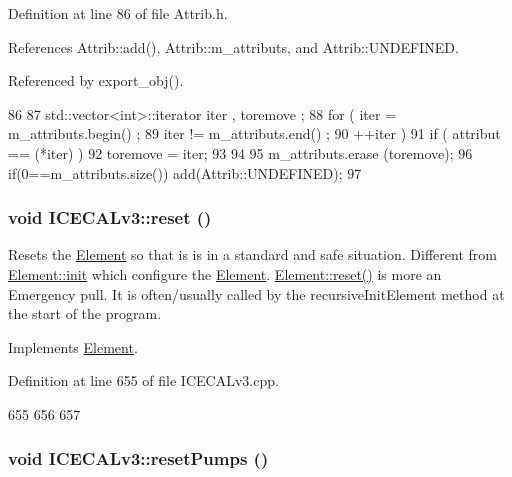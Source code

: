 Definition at line 86 of file Attrib.h.

References Attrib::add(), Attrib::m\_\-attributs, and Attrib::UNDEFINED.

Referenced by export\_\-obj().


\begin{DoxyCode}
86                                {
87     std::vector<int>::iterator iter , toremove ;
88     for ( iter  = m_attributs.begin() ;
89           iter != m_attributs.end()   ;
90           ++iter ) {
91       if ( attribut == (*iter) ) {
92         toremove = iter;
93       }
94     }
95     m_attributs.erase (toremove);
96     if(0==m_attributs.size()) add(Attrib::UNDEFINED);
97   }
\end{DoxyCode}
\hypertarget{classICECALv3_a33afc7c8e0f399336152abd03cbe8d1b}{
\subsubsection[{reset}]{\setlength{\rightskip}{0pt plus 5cm}void ICECALv3::reset ()}}
\label{classICECALv3_a33afc7c8e0f399336152abd03cbe8d1b}
Resets the \hyperlink{classElement}{Element} so that is is in a standard and safe situation. Different from \hyperlink{classElement_af42754b5cabc198869222725218d695c}{Element::init} which configure the \hyperlink{classElement}{Element}. \hyperlink{classElement_a69efffa22f06909d768149715565cb56}{Element::reset()} is more an Emergency pull. It is often/usually called by the recursiveInitElement method at the start of the program. 

Implements \hyperlink{classElement_a69efffa22f06909d768149715565cb56}{Element}.

Definition at line 655 of file ICECALv3.cpp.


\begin{DoxyCode}
655                     {
656 
657 }
\end{DoxyCode}
\hypertarget{classICECALv3_a1b9ca0e09d45634a70da6f19a7257314}{
\subsubsection[{resetPumps}]{\setlength{\rightskip}{0pt plus 5cm}void ICECALv3::resetPumps ()}}
\label{classICECALv3_a1b9ca0e09d45634a70da6f19a7257314}



